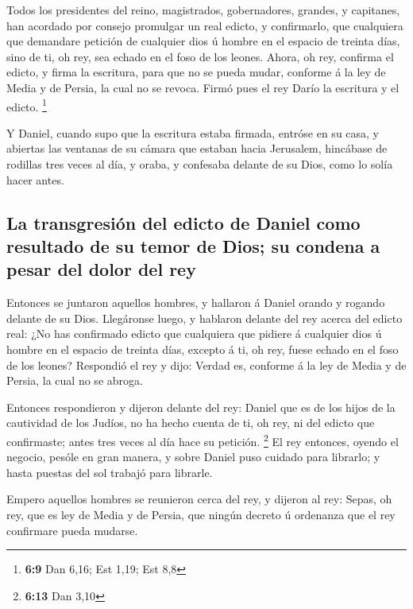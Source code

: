  Todos los presidentes del reino, magistrados, gobernadores,
grandes, y capitanes, han acordado por consejo promulgar un real edicto,
y confirmarlo, que cualquiera que demandare petición de cualquier dios ú
hombre en el espacio de treinta días, sino de ti, oh rey, sea echado en
el foso de los leones.  Ahora, oh rey, confirma el edicto, y
firma la escritura, para que no se pueda mudar, conforme á la ley de
Media y de Persia, la cual no se revoca.  Firmó pues el rey
Darío la escritura y el edicto. \footnote{\textbf{6:9} Dan 6,16; Est
  1,19; Est 8,8}

 Y Daniel, cuando supo que la escritura estaba firmada,
entróse en su casa, y abiertas las ventanas de su cámara que estaban
hacia Jerusalem, hincábase de rodillas tres veces al día, y oraba, y
confesaba delante de su Dios, como lo solía hacer antes.

\hypertarget{la-transgresiuxf3n-del-edicto-de-daniel-como-resultado-de-su-temor-de-dios-su-condena-a-pesar-del-dolor-del-rey}{%
\subsection{La transgresión del edicto de Daniel como resultado de su
temor de Dios; su condena a pesar del dolor del
rey}\label{la-transgresiuxf3n-del-edicto-de-daniel-como-resultado-de-su-temor-de-dios-su-condena-a-pesar-del-dolor-del-rey}}

 Entonces se juntaron aquellos hombres, y hallaron á Daniel
orando y rogando delante de su Dios.  Llegáronse luego, y
hablaron delante del rey acerca del edicto real: ¿No has confirmado
edicto que cualquiera que pidiere á cualquier dios ú hombre en el
espacio de treinta días, excepto á ti, oh rey, fuese echado en el foso
de los leones? Respondió el rey y dijo: Verdad es, conforme á la ley de
Media y de Persia, la cual no se abroga.

 Entonces respondieron y dijeron delante del rey: Daniel
que es de los hijos de la cautividad de los Judíos, no ha hecho cuenta
de ti, oh rey, ni del edicto que confirmaste; antes tres veces al día
hace su petición. \footnote{\textbf{6:13} Dan 3,10}  El rey
entonces, oyendo el negocio, pesóle en gran manera, y sobre Daniel puso
cuidado para librarlo; y hasta puestas del sol trabajó para librarle.

 Empero aquellos hombres se reunieron cerca del rey, y
dijeron al rey: Sepas, oh rey, que es ley de Media y de Persia, que
ningún decreto ú ordenanza que el rey confirmare pueda mudarse.

